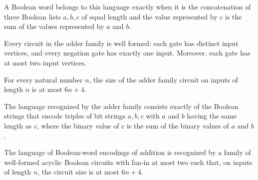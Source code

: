 \begin{definition}
\label{Language.addition}
\leanok
{}
A Boolean word belongs to this language exactly when it is the concatenation of three
Boolean lists $a,b,c$ of equal length and the value represented by $c$ is the sum of the
values represented by $a$ and $b$.
\end{definition}

\begin{theorem}
\label{BoolCircuit.adderFamily_hasFaninTwo}
\leanok
{}
Every circuit in the adder family is well formed: each gate has distinct input vertices,
and every negation gate has exactly one input. Moreover, each gate has at most two input
vertices.
\end{theorem}

\begin{theorem}
\label{BoolCircuit.adderFamily_size_le}
\leanok
{}
For every natural number $n$, the size of the adder family circuit on inputs of length
$n$ is at most $6n+4$.
\end{theorem}

\begin{theorem}
\label{BoolCircuit.adderFamily_language}
\leanok
{}
The language recognized by the adder family consists exactly of the Boolean strings that
encode triples of bit strings $a,b,c$ with $a$ and $b$ having the same length as $c$,
where the binary value of $c$ is the sum of the binary values of $a$ and $b$.
\end{theorem}

\begin{theorem}
\label{Language.addition_inSIZE}
\leanok
{}
The language of Boolean-word encodings of addition is recognized by a family of
well-formed acyclic Boolean circuits with fan-in at most two such that, on inputs of
length $n$, the circuit size is at most $6n+4$.
\end{theorem}

